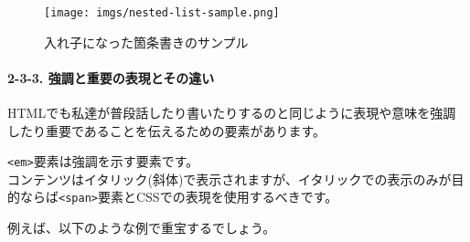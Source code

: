 \begin{Shaded}
\begin{Highlighting}[]
      \DataTypeTok{\textless{}}\DataTypeTok{\textgreater{}}\DataTypeTok{\textless{}/}\DataTypeTok{\textgreater{}}
      \DataTypeTok{\textless{}}\DataTypeTok{\textgreater{}}\DataTypeTok{\textless{}/}\DataTypeTok{\textgreater{}}
      \DataTypeTok{\textless{}}\DataTypeTok{\textgreater{}}\DataTypeTok{\textless{}/}\DataTypeTok{\textgreater{}}
      \DataTypeTok{\textless{}}\DataTypeTok{\textgreater{}}\DataTypeTok{\textless{}/}\DataTypeTok{\textgreater{}}
    \DataTypeTok{\textless{}/}\DataTypeTok{\textgreater{}}
  \DataTypeTok{\textless{}/}\DataTypeTok{\textgreater{}}
\DataTypeTok{\textless{}/}\DataTypeTok{\textgreater{}}
\end{Highlighting}
\end{Shaded}

\begin{figure}
\centering
\texttt{[image: imgs/nested-list-sample.png]}
\caption{入れ子になった箇条書きのサンプル}
\end{figure}

\paragraph{2-3-3.
強調と重要の表現とその違い}\label{ux5f37ux8abfux3068ux91cdux8981ux306eux8868ux73feux3068ux305dux306eux9055ux3044}

HTMLでも私達が普段話したり書いたりするのと同じように表現や意味を強調したり重要であることを伝えるための要素があります。

\texttt{\textless{}em\textgreater{}}要素は強調を示す要素です。\\
コンテンツはイタリック(斜体)で表示されますが、イタリックでの表示のみが目的ならば\texttt{\textless{}span\textgreater{}}要素とCSSでの表現を使用するべきです。

例えば、以下のような例で重宝するでしょう。

